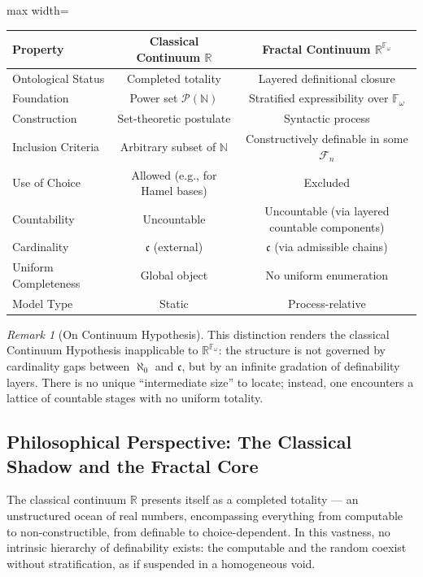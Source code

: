 \documentclass[12pt]{article}
\theoremstyle{definition}
\theoremstyle{plain}
\theoremstyle{remark}
\newtheorem*{remark}{Remark}
\begin{document}
\begin{center}
\begin{adjustbox}{max width=\textwidth}
\begin{tabular}{@{} lcc @{}}
\toprule
\textbf{Property} & \textbf{Classical Continuum \( \mathbb{R} \)} & \textbf{Fractal Continuum \( \mathbb{R}^{\mathbb{F}_\omega} \)} \\
\midrule
Ontological Status & Completed totality & Layered definitional closure \\
Foundation & Power set \( \mathcal{P}(\mathbb{N}) \) & Stratified expressibility over \( \mathbb{F}_\omega \) \\
Construction & Set-theoretic postulate & Syntactic process \\
Inclusion Criteria & Arbitrary subset of \( \mathbb{N} \) & Constructively definable in some \( \mathcal{F}_n \) \\
Use of Choice & Allowed (e.g., for Hamel bases) & Excluded \\
Countability & Uncountable & Uncountable (via layered countable components) \\
Cardinality & \( \mathfrak{c} \) (external) & \( \mathfrak{c} \) (via admissible chains) \\
Uniform Completeness & Global object & No uniform enumeration \\
Model Type & Static & Process-relative \\
\bottomrule
\end{tabular}
\end{adjustbox}
\end{center}

\begin{remark}[On Continuum Hypothesis]
This distinction renders the classical Continuum Hypothesis inapplicable to \( \mathbb{R}^{\mathbb{F}_\omega} \): the structure is not governed by cardinality gaps between \( \aleph_0 \) and \( \mathfrak{c} \), but by an infinite gradation of definability layers. There is no unique “intermediate size” to locate; instead, one encounters a lattice of countable stages with no uniform totality.
\end{remark}

\subsection*{Philosophical Perspective: The Classical Shadow and the Fractal Core}

The classical continuum \( \mathbb{R} \) presents itself as a completed totality — an unstructured ocean of real numbers, encompassing everything from computable to non-constructible, from definable to choice-dependent. In this vastness, no intrinsic hierarchy of definability exists: the computable and the random coexist without stratification, as if suspended in a homogeneous void.
\end{document}
